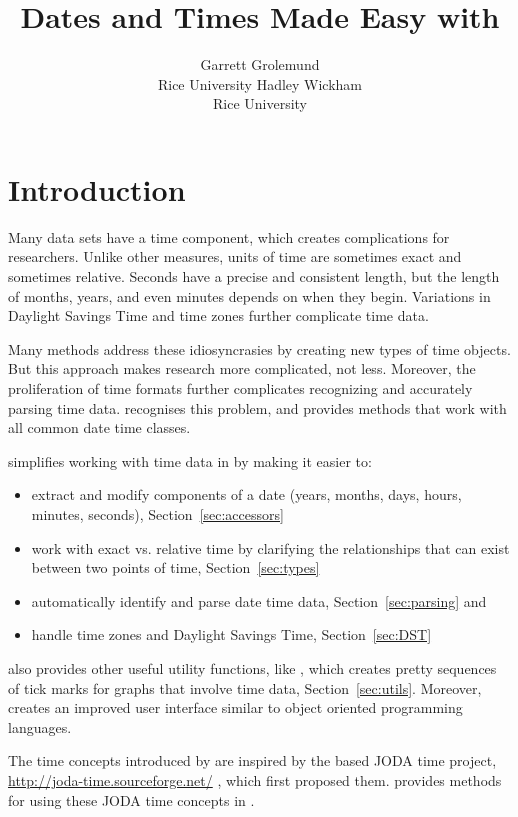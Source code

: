 \documentclass[article]{jss}
\author{Garrett Grolemund\\Rice University \And 
        Hadley Wickham\\Rice University}
\title{Dates and Times Made Easy with \pkg{lubridate}}
\begin{document}
\section{Introduction}

Many data sets have a time component, which creates complications for researchers. Unlike other measures, units of time are sometimes exact and sometimes relative.  Seconds have a precise and consistent length, but the length of months, years, and even minutes depends on when they begin. Variations in Daylight Savings Time and time zones further complicate time data.

Many  methods address these idiosyncrasies by creating new types of time objects.  But this approach makes research more complicated, not less. Moreover, the proliferation of time formats further complicates recognizing and accurately parsing time data.   recognises this problem, and provides methods that work with all common date time classes.

 simplifies working with time data in  by making it easier to:

\begin{itemize}
  \item extract and modify components of a date (years, months, days, hours, minutes, seconds), Section~\ref{sec:accessors}
  
  \item work with exact vs. relative time by clarifying the relationships that can exist between two points of time, Section~\ref{sec:types}
  
  \item automatically identify and parse date time data, Section~\ref{sec:parsing} and
  
  \item handle time zones and Daylight Savings Time, Section~\ref{sec:DST} 
  
\end{itemize}

 also provides other useful utility functions, like , which creates pretty sequences of tick marks for graphs that involve time data,  Section~\ref{sec:utils}. Moreover,  creates an improved user interface similar to object oriented programming languages.

The time concepts introduced by  are inspired by the  based JODA time project, \url{http://joda-time.sourceforge.net/} , which first proposed them.  provides methods for using these JODA time concepts in .
\end{document}
